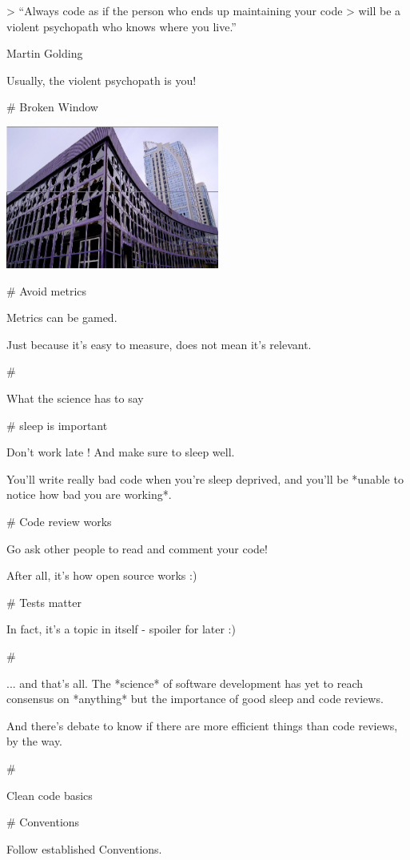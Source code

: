 > “Always code as if the person who ends up maintaining your code
> will be a violent psychopath who knows where you live.”

Martin Golding

Usually, the violent psychopath is you!

# Broken Window

\includegraphics[width=7cm]{broken-windows.png}

# Avoid metrics

Metrics can be gamed.

Just because it's easy to measure, does not mean it's relevant.

#

\huge \center What the science has to say


# sleep is important

Don't work late ! And make sure to sleep well.

\vfill

You'll write really bad code when you're sleep deprived, and you'll be
*unable to notice how bad you are working*.

# Code review works

Go ask other people to read and comment your code!

After all, it's how open source works :)

# Tests matter

In fact, it's a topic in itself - spoiler for later :)

#

... and that's all. The *science* of software development has yet to reach
consensus on *anything* but the importance of good sleep and code reviews.

And there's debate to know if there are more efficient things than code
reviews, by the way.


#

\huge \center Clean code basics

# Conventions

Follow established Conventions.

